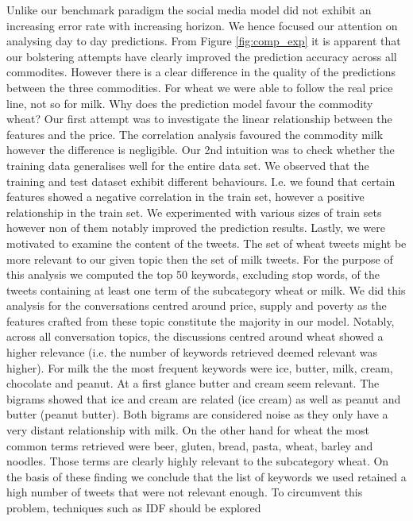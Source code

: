 Unlike our benchmark paradigm the social media model did not exhibit an increasing error rate with increasing horizon. We hence focused our attention on analysing day to day predictions. From Figure \ref{fig:comp_exp} it is apparent that our bolstering attempts have clearly improved the prediction accuracy across all commodites. However there is a clear difference in the quality of the predictions between the three commodities. For wheat we were able to follow the real price line, not so for milk. Why does the prediction model favour the commodity wheat? Our first attempt was to investigate the linear relationship between the features and the price. The correlation analysis favoured the commodity milk however the difference is negligible. Our 2nd intuition was to check whether the training data generalises well for the entire data set. We observed that the training and test dataset exhibit different behaviours. I.e. we found that certain features showed a negative correlation in the train set, however a positive relationship in the train set. We experimented with various sizes of train sets however non of them notably improved the prediction results. Lastly, we were motivated to examine the content of the tweets. The set of wheat tweets might be more relevant to our given topic then the set of milk tweets. For the purpose of this analysis we computed the top 50 keywords, excluding stop words,  of the tweets containing at least one term of the subcategory wheat or milk. We did this analysis for the conversations centred around price, supply and poverty as the features crafted from these topic constitute the majority in our model. Notably, across all conversation topics, the discussions centred around wheat showed a higher relevance (i.e. the number of keywords retrieved  deemed relevant was higher). For milk the the most frequent keywords were ice, butter,  milk, cream, chocolate and peanut. At a first glance butter and cream seem relevant. The bigrams showed that ice and cream are related (ice cream) as well as peanut and butter (peanut butter). Both bigrams are considered noise as they only have a very distant relationship with milk. On the other hand for wheat the most common terms retrieved were beer, gluten, bread, pasta, wheat, barley and noodles.  Those terms are clearly highly relevant to the subcategory wheat. On the basis of these finding we conclude that the list of keywords we used retained a high number of tweets that were not relevant enough. To circumvent this problem, techniques such as IDF should be explored 





